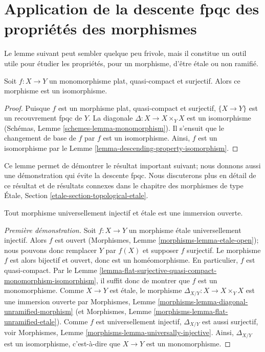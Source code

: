 \section{Application de la descente fpqc des propriétés des morphismes}
\label{section-application-descending-properties-morphisms}

\noindent
Le lemme suivant peut sembler quelque peu frivole, mais il constitue un outil
utile pour étudier les propriétés, pour un morphisme, d'être \'etale ou non
ramifié.

\begin{lemma}
\label{lemma-flat-surjective-quasi-compact-monomorphism-isomorphism}
Soit $f : X \to Y$ un monomorphisme plat, quasi-compact et surjectif.
Alors ce morphisme est un isomorphisme.
\end{lemma}

\begin{proof}
Puisque $f$ est un morphisme plat, quasi-compact et surjectif,
$\{X \to Y\}$ est un recouvrement fpqc de $Y$.
La diagonale $\Delta : X \to X \times_Y X$ est un isomorphisme
(Schémas, Lemme \ref{schemes-lemma-monomorphism}).
Il s'ensuit que le changement de base de $f$ par $f$ est un
isomorphisme. Ainsi, $f$ est un isomorphisme par le
Lemme \ref{lemma-descending-property-isomorphism}.
\end{proof}

\noindent
Ce lemme permet de démontrer le résultat important suivant; nous donnons aussi
une démonstration qui évite la descente fpqc.
Nous discuterons plus en détail de ce résultat et de résultats connexes dans
le chapitre des morphismes de type \'Etale, Section
\ref{etale-section-topological-etale}.

\begin{lemma}
\label{lemma-universally-injective-etale-open-immersion}
Tout morphisme universellement injectif et \'etale est une immersion ouverte.
\end{lemma}

\begin{proof}[Première démonstration]
Soit $f : X \to Y$ un morphisme \'etale universellement injectif.
Alors $f$ est ouvert
(Morphismes, Lemme \ref{morphisms-lemma-etale-open});
nous pouvons donc remplacer $Y$ par $f(X)$ et supposer $f$ surjectif.
Le morphisme $f$ est alors bijectif et ouvert, donc est un homéomorphisme.
En particulier, $f$ est quasi-compact. Par le
Lemme \ref{lemma-flat-surjective-quasi-compact-monomorphism-isomorphism},
il suffit donc de montrer que $f$ est un monomorphisme.
Comme $X \to Y$ est \'etale, le morphisme
$\Delta_{X/Y} : X \to X \times_Y X$ est une immersion ouverte par
Morphismes, Lemme \ref{morphisms-lemma-diagonal-unramified-morphism}
(et Morphismes, Lemme \ref{morphisms-lemma-flat-unramified-etale}).
Comme $f$ est universellement injectif, $\Delta_{X/Y}$ est aussi surjectif,
voir Morphismes, Lemme \ref{morphisms-lemma-universally-injective}.
Ainsi, $\Delta_{X/Y}$ est un isomorphisme, c'est-à-dire que
$X \to Y$ est un monomorphisme.
\end{proof}

